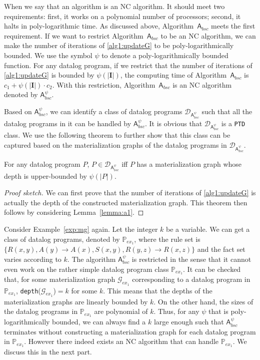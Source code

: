 \documentclass[final,1p,times]{elsarticle}
\begin{document}
When we say that an algorithm is an NC algorithm. It should meet two requirements: first,
it works on a polynomial number of processors; second, it halts in poly-logarithmic time.
As discussed above, Algorithm~$\mathsf{A}_{bsc}$ meets the first requirement.
If we want to restrict Algorithm~$\mathsf{A}_{bsc}$ to be an NC algorithm,
we can make the number of iterations of \ref{alg1:updateG} to be poly-logarithmically bounded.
We use the symbol $\psi$ to denote a poly-logarithmically bounded function.
For any datalog program, if we restrict that the number of iterations of \ref{alg1:updateG} is bounded by $\psi(|\textbf{I}|)$, 
the computing time of Algorithm~$\mathsf{A}_{bsc}$
is $c_1+\psi(|\textbf{I}|)\cdot c_2$. With this restriction, Algorithm~$\mathsf{A}_{bsc}$ is an NC algorithm denoted by
$\mathsf{A}_{bsc}^{\psi}$.

Based on $\mathsf{A}_{bsc}^{\psi}$, we can identify a class of datalog programs
$\mathcal{D}_{\mathsf{A}_{bsc}^{\psi}}$ such that all the datalog programs in it can be handled
by $\mathsf{A}_{bsc}^{\psi}$.
It is obvious that $\mathcal{D}_{\mathsf{A}_{bsc}^{\psi}}$ is a \texttt{PTD} class.
We use the following theorem to further show that this class can be captured based on
the materialization graphs of the datalog programs in $\mathcal{D}_{\mathsf{A}_{bsc}^{\psi}}$.

\begin{theorem}\label{theorem:a1}
For any datalog program $P$, $P\in\mathcal{D}_{\mathsf{A}_{bsc}^{\psi}}$ iff $P$ has a
materialization graph whose depth is upper-bounded by $\psi(|P|)$.
\end{theorem}

\begin{proof}[Proof sketch]
We can first prove that the number of iterations
of \ref{alg1:updateG} is actually the depth of the constructed materialization
graph. This theorem then follows by considering
Lemma~\ref{lemma:a1}.
\end{proof}

Consider Example~\ref{exp:mg} again. Let the integer $k$ be a variable. We can
get a class of datalog programs, denoted by $\mathbb{P}_{ex_1}$, where the rule set
is $\{R(x,y),A(y)\rightarrow A(x), S(x,y),R(y,z)\rightarrow R(x,z)\}$ and the fact
set varies according to $k$. The algorithm $\mathsf{A}_{bsc}^{\psi}$ is restricted in the sense that it cannot even work on the rather simple datalog program class $\mathbb{P}_{ex_1}$.
It can be checked that, for some materialization graph $\mathcal{G}_{ex_1}$
corresponding to a datalog program in $\mathbb{P}_{ex_1}$, \texttt{depth}($\mathcal{G}_{ex_1}$)$=k$ for some $k$.
This means that the depths of the materialization graphs are linearly bounded by $k$.
On the other hand, the sizes of the datalog programs in $\mathbb{P}_{ex_1}$ are polynomial of $k$.
Thus, for any $\psi$ that is poly-logarithmically bounded, we can always find a $k$ large
enough such that $\mathsf{A}_{bsc}^{\psi}$ terminates without constructing a materialization
graph for each datalog program in $\mathbb{P}_{ex_1}$.
However there indeed exists an NC algorithm that can handle $\mathbb{P}_{ex_1}$.
We discuss this in the next part.
\end{document}

